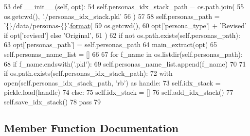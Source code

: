 \begin{DoxyCode}
53     \textcolor{keyword}{def }\_\_init\_\_(self, opt):
54         self.personas\_idx\_stack\_path = os.path.join(
55             os.getcwd(), \textcolor{stringliteral}{'./personas\_idx\_stack.pkl'}
56         )
57 
58         self.personas\_path = \textcolor{stringliteral}{'\{\}/data/personas-\{\}'}.\hyperlink{namespaceparlai_1_1chat__service_1_1services_1_1messenger_1_1shared__utils_a32e2e2022b824fbaf80c747160b52a76}{format}(
59             os.getcwd(),
60             opt[\textcolor{stringliteral}{'persona\_type'}] + \textcolor{stringliteral}{'Revised'} \textcolor{keywordflow}{if} opt[\textcolor{stringliteral}{'revised'}] \textcolor{keywordflow}{else} \textcolor{stringliteral}{'Original'},
61         )
62         \textcolor{keywordflow}{if} \textcolor{keywordflow}{not} os.path.exists(self.personas\_path):
63             opt[\textcolor{stringliteral}{'personas\_path'}] = self.personas\_path
64             main\_extract(opt)
65         self.personas\_name\_list = []
66 
67         \textcolor{keywordflow}{for} f\_name \textcolor{keywordflow}{in} os.listdir(self.personas\_path):
68             \textcolor{keywordflow}{if} f\_name.endswith(\textcolor{stringliteral}{'.pkl'}):
69                 self.personas\_name\_list.append(f\_name)
70 
71         \textcolor{keywordflow}{if} os.path.exists(self.personas\_idx\_stack\_path):
72             with open(self.personas\_idx\_stack\_path, \textcolor{stringliteral}{'rb'}) \textcolor{keyword}{as} handle:
73                 self.idx\_stack = pickle.load(handle)
74         \textcolor{keywordflow}{else}:
75             self.idx\_stack = []
76             self.add\_idx\_stack()
77             self.save\_idx\_stack()
78         \textcolor{keywordflow}{pass}
79 
\end{DoxyCode}


\subsection{Member Function Documentation}
\mbox{\label{classpersonachat__eval_1_1worlds_1_1PersonasGenerator_a3ee1d0c2545efba647539933d1d649d0}} 
